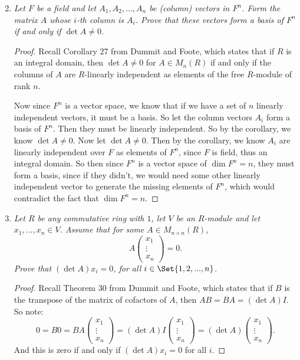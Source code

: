 \documentclass[9pt,reqno,twoside]{amsbook}
\theoremstyle{plain}
\numberwithin{section}{chapter}
\numberwithin{equation}{chapter}
\theoremstyle{definition}
\theoremstyle{remark}
\theoremstyle{plain}
\newcommand{\lpar}{\left(}
\newcommand{\rpar}{\right)}
\begin{document}
\begin{enumerate}[label=\arabic*.]
\setcounter{enumi}{1}
\item \textit{Let $F$ be a field and let $A_1,A_2,...,A_n$ be (column) vectors in $F^n$. Form the matrix $A$ whose $i$-th column is $A_i$. Prove that these vectors form a basis of $F^n$ if and only if $\det A \neq 0$. }

\begin{proof}
Recall Corollary 27 from Dummit and Foote, which states that if $R$ is an integral domain, then $\det A \neq 0$ for $A \in M_n(R)$ if and only if the columns of $A$ are $R$-linearly independent as elements of the free $R$-module of rank $n$. 


Now since $F^n$ is a vector space, we know that if we have a set of $n$ linearly independent vectors, it must be a basis. So let the column vectors $A_i$ form a basis of $F^n$. Then they must be linearly independent. So by the corollary, we know $\det A \neq 0$. Now let $\det A \neq 0$. Then by the corollary, we know $A_i$ are linearly independent over $F$ as elements of $F^n$, since $F$ is field, thus an integral domain. So then since $F^n$ is a vector space of $\dim F^n = n$, they must form a basis, since if they didn't, we would need some other linearly independent vector to generate the missing elements of $F^n$, which would contradict the fact that $\dim F^n = n$. 
\end{proof}

\item \textit{Let $R$ be any commutative ring with $1$, let $V$ be an $R$-module and let $x_1,...,x_n \in V$. Assume that for some $A \in M_{n \times n}(R)$,
$$
A\lpar 
\begin{matrix}
x_1\\
\vdots\\
x_n
\end{matrix} \rpar  = 0.
$$
Prove that $(\det A)x_i = 0$, for all $i \in \Set{1,2,...,n}$. }

\begin{proof}
Recall Theorem 30 from Dummit and Foote, which states that if $B$ is the transpose of the matrix of cofactors of $A$, then $AB = BA = (\det A) I$. So note:
$$
0 = B0 = BA\lpar 
\begin{matrix}
x_1\\
\vdots\\
x_n
\end{matrix} \rpar = (\det A)I\lpar 
\begin{matrix}
x_1\\
\vdots\\
x_n
\end{matrix} \rpar = (\det A)\lpar 
\begin{matrix}
x_1\\
\vdots\\
x_n
\end{matrix} \rpar.
$$
And this is zero if and only if $(\det A)x_i = 0$ for all $i$. 
\end{proof}



\end{enumerate}
\end{document}
